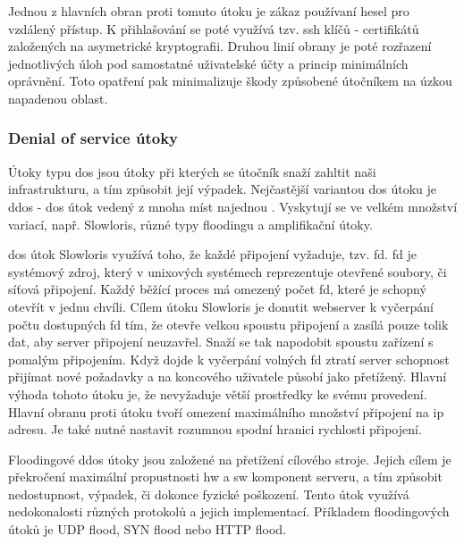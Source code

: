 Jednou z hlavních obran proti tomuto útoku je zákaz používaní hesel pro vzdálený přístup. K přihlašování se poté využívá tzv. \acrshort{ssh} klíčů\cite{ssh-keys} - certifikátů založených na asymetrické kryptografii. Druhou linií obrany je poté rozřazení jednotlivých úloh pod samostatné uživatelské účty a princip minimálních oprávnění. Toto opatření pak minimalizuje škody způsobené útočníkem na úzkou napadenou oblast. 

\subsubsection{Denial of service útoky}

Útoky typu \acrfull{dos}\cite{denial-of-service} jsou útoky při kterých se útočník snaží zahltit naši infrastrukturu, a tím způsobit její výpadek.
Nejčastější variantou \acrshort{dos} útoku je \acrfull{ddos} - \acrshort{dos} útok vedený z mnoha míst najednou \cite{distributed-denial-of-service}. 
Vyskytují se ve velkém množství variací, např. Slowloris, různé typy floodingu a amplifikační útoky.


\noindent
\acrshort{dos} útok Slowloris\cite{slowloris} využívá toho, že každé připojení vyžaduje, tzv. \acrfull{fd}\cite{fd}. \acrshort{fd} je systémový zdroj, který v unixových systémech reprezentuje otevřené soubory, či síťová připojení. Každý běžící proces má omezený počet \acrshort{fd}, které je schopný otevřít v jednu chvíli. Cílem útoku Slowloris je donutit webserver k vyčerpání počtu dostupných \acrshort{fd} tím, že otevře velkou spoustu připojení a zasílá pouze tolik dat, aby server připojení neuzavřel. Snaží se tak napodobit spoustu zařízení s pomalým připojením. Když dojde k vyčerpání volných \acrshort{fd} ztratí server schopnost přijímat nové požadavky a na koncového uživatele působí jako přetížený. Hlavní výhoda tohoto útoku je, že nevyžaduje větší prostředky ke svému provedení. Hlavní obranu proti útoku tvoří omezení maximálního množství připojení na \acrshort{ip} adresu. Je také nutné nastavit rozumnou spodní hranici rychlosti připojení.

\label{subsec:ddos-flood-attack}

\noindent
Floodingové \acrshort{ddos} útoky jsou založené na přetížení cílového stroje. Jejich cílem je překročení maximální propustnosti \acrshort{hw} a \acrshort{sw} komponent serveru, a tím způsobit nedostupnost, výpadek, či dokonce fyzické poškození. Tento útok využívá nedokonalosti různých protokolů a jejich implementací. Příkladem floodingových útoků je UDP flood\cite{udp-flood}, SYN flood\cite{syn-flood} nebo HTTP flood\cite{http-flood}.

